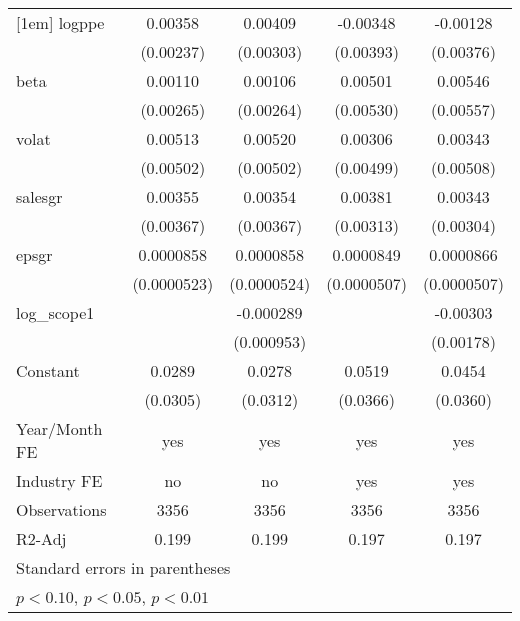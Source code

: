 \begin{table}[htbp]
\begin{tabular}{l*{4}{c}}
[1em]
logppe              &     0.00358         &     0.00409         &    -0.00348         &    -0.00128         \\
                    &   (0.00237)         &   (0.00303)         &   (0.00393)         &   (0.00376)         \\
[1em]
beta                &     0.00110         &     0.00106         &     0.00501         &     0.00546         \\
                    &   (0.00265)         &   (0.00264)         &   (0.00530)         &   (0.00557)         \\
[1em]
volat               &     0.00513         &     0.00520         &     0.00306         &     0.00343         \\
                    &   (0.00502)         &   (0.00502)         &   (0.00499)         &   (0.00508)         \\
[1em]
salesgr             &     0.00355         &     0.00354         &     0.00381         &     0.00343         \\
                    &   (0.00367)         &   (0.00367)         &   (0.00313)         &   (0.00304)         \\
[1em]
epsgr               &   0.0000858         &   0.0000858         &   0.0000849\sym{*}  &   0.0000866\sym{*}  \\
                    & (0.0000523)         & (0.0000524)         & (0.0000507)         & (0.0000507)         \\
[1em]
log\_scope1          &                     &   -0.000289         &                     &    -0.00303\sym{*}  \\
                    &                     &  (0.000953)         &                     &   (0.00178)         \\
[1em]
Constant            &      0.0289         &      0.0278         &      0.0519         &      0.0454         \\
                    &    (0.0305)         &    (0.0312)         &    (0.0366)         &    (0.0360)         \\
\hline
Year/Month FE       &         yes         &         yes         &         yes         &         yes         \\
Industry FE         &          no         &          no         &         yes         &         yes         \\
Observations        &        3356         &        3356         &        3356         &        3356         \\
R2-Adj              &       0.199         &       0.199         &       0.197         &       0.197         \\
\hline\hline
\multicolumn{5}{l}{\footnotesize Standard errors in parentheses}\\
\multicolumn{5}{l}{\footnotesize \sym{*} \(p<0.10\), \sym{**} \(p<0.05\), \sym{***} \(p<0.01\)}\\
\end{tabular}
\end{table}

